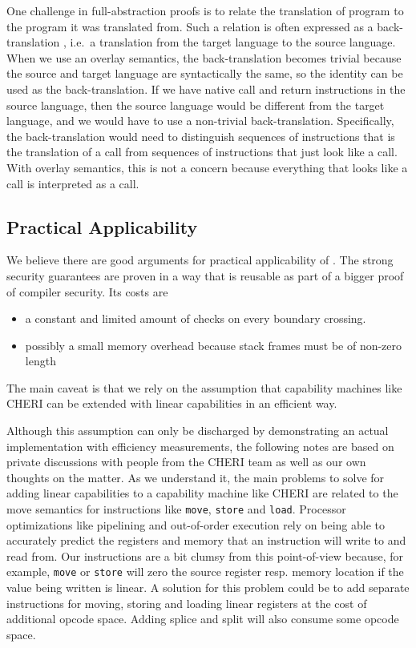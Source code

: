 \begin{jversion}
  One challenge in full-abstraction proofs is to relate the translation of program to the program it was translated from.
  Such a relation is often expressed as a back-translation  \citep{devriese_modular_2017}, i.e.\ a translation from the target language to the source language.
  When we use an overlay semantics, the back-translation becomes trivial because the source and target language are syntactically the same, so the identity can be used as the back-translation.
  If we have native call and return instructions in the source language, then the source language would be different from the target language, and we would have to use a non-trivial back-translation.
  Specifically, the back-translation would need to distinguish sequences of instructions that is the translation of a call from sequences of instructions that just look like a call.
  With overlay semantics, this is not a concern because everything that looks like a call is interpreted as a call.
\end{jversion}

\subsection{Practical Applicability}
We believe there are good arguments for practical applicability of \stktokens{}.
The strong security guarantees are proven in a way that is reusable as part of a bigger proof of compiler security.
Its costs are
\begin{itemize}
\item a constant and limited amount of checks on every boundary crossing.
\item possibly a small memory overhead because stack frames must be of non-zero length
\end{itemize}
The main caveat is that we rely on the assumption that capability machines like CHERI can be extended with linear capabilities in an efficient way.

Although this assumption can only be discharged by demonstrating an actual implementation with efficiency measurements, the following notes are based on private discussions with people from the CHERI team as well as our own thoughts on the matter.
As we understand it, the main problems to solve for adding linear capabilities to a capability machine like CHERI are related to the move semantics for instructions like \texttt{move}, \texttt{store} and \texttt{load}.
Processor optimizations like pipelining and out-of-order execution rely on being able to accurately predict the registers and memory that an instruction will write to and read from.
Our instructions are a bit clumsy from this point-of-view because, for example, \texttt{move} or \texttt{store} will zero the source register resp. memory location if the value being written is linear.
A solution for this problem could be to add separate instructions for moving, storing and loading linear registers at the cost of additional opcode space.
Adding splice and split will also consume some opcode space.


